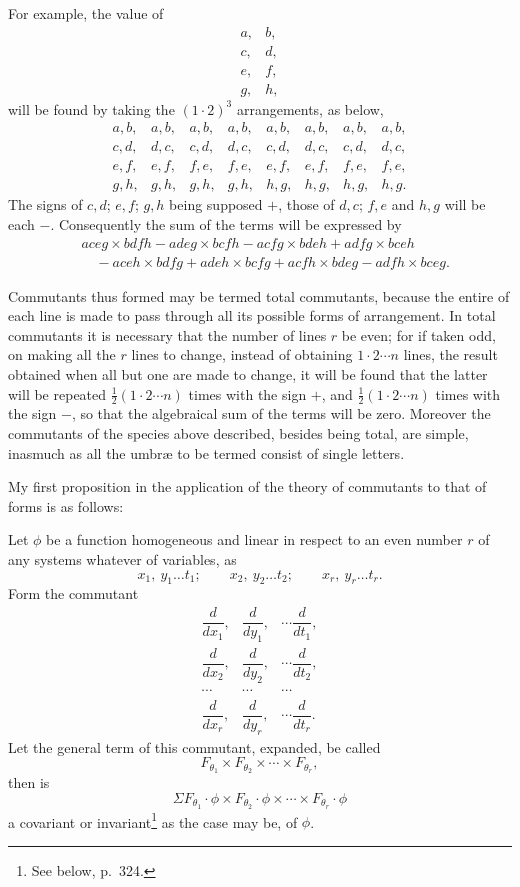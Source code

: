 \documentclass[11pt]{article}
\newcommand{\sourcepage}[1]{\marginpar{\scriptsize p.~#1}}
\begin{document}
{{For example, the value of
\[
\begin{array}{cc}
a,&b,\\
c,&d,\\
e,&f,\\
g,&h,
\end{array}
\]
will be found by taking the $(1\cdot2)^3$ arrangements, as below,
\[
\begin{array}{cccccccc}
a,b,&a,b,&a,b,&a,b,&a,b,&a,b,&a,b,&a,b,\\
c,d,&d,c,&c,d,&d,c,&c,d,&d,c,&c,d,&d,c,\\
e,f,&e,f,&f,e,&f,e,&e,f,&e,f,&f,e,&f,e,\\
g,h,&g,h,&g,h,&g,h,&h,g,&h,g,&h,g,&h,g.
\end{array}
\]
The signs of $c,d$; $e,f$; $g,h$ being supposed $+$, those of $d,c$; $f,e$ and $h,g$ will be each $-$. Consequently the sum of the terms will be expressed by
\[
\begin{aligned}
&aceg\times bdfh-adeg\times bcfh-acfg\times bdeh+adfg\times bceh\\
&\quad -aceh\times bdfg+adeh\times bcfg+acfh\times bdeg-adfh\times bceg.
\end{aligned}
\]


\sourcepage{307}
Commutants thus formed may be termed total commutants, because the entire of each line is made to pass through all its possible forms of arrangement. In total commutants it is necessary that the number of lines $r$ be even; for if taken odd, on making all the $r$ lines to change, instead of obtaining $1\cdot2\cdots n$ lines, the result obtained when all but one are made to change, it will be found that the latter will be repeated $\frac12(1\cdot2\cdots n)$ times with the sign $+$, and $\frac12(1\cdot2\cdots n)$ times with the sign $-$, so that the algebraical sum of the terms will be zero. Moreover the commutants of the species above described, besides being total, are simple, inasmuch as all the umbræ to be termed consist of single letters.

My first proposition in the application of the theory of commutants to that of forms is as follows:

Let $\phi$ be a function homogeneous and linear in respect to an even number $r$ of any systems whatever of variables, as
\[
x_1,\ y_1\ldots t_1;\qquad x_2,\ y_2\ldots t_2;\qquad x_r,\ y_r\ldots t_r.
\]
Form the commutant
\[
\begin{array}{ccc}
\dfrac{d}{dx_1},&\dfrac{d}{dy_1},&\cdots\dfrac{d}{dt_1},\\[0.7em]
\dfrac{d}{dx_2},&\dfrac{d}{dy_2},&\cdots\dfrac{d}{dt_2},\\
\cdots&\cdots&\cdots\\[0.4em]
\dfrac{d}{dx_r},&\dfrac{d}{dy_r},&\cdots\dfrac{d}{dt_r}.
\end{array}
\]
Let the general term of this commutant, expanded, be called
\[
F_{\theta_1}\times F_{\theta_2}\times\cdots\times F_{\theta_r},
\]
then is
\[
\Sigma F_{\theta_1}\!\cdot\!\phi\times F_{\theta_2}\!\cdot\!\phi\times\cdots\times F_{\theta_r}\!\cdot\!\phi
\]
a covariant or invariant\footnote{See below, p.~324.} as the case may be, of $\phi$.

}}
\end{document}
